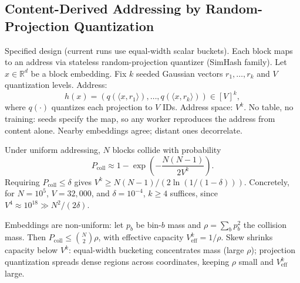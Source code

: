 \subsection{Content-Derived Addressing by Random-Projection Quantization}
\label{sec:hash}

Specified design (current runs use equal-width scalar buckets).
Each block maps to an address via stateless random-projection quantizer (SimHash family).
Let $x \in \mathbb{R}^d$ be a block embedding.
Fix $k$ seeded Gaussian vectors $r_1,\dots,r_k$ and $V$ quantization levels.
Address:
\[
h(x) = (q(\langle x, r_1 \rangle), \dots, q(\langle x, r_k \rangle)) \in [V]^k,
\]
where $q(\cdot)$ quantizes each projection to $V$ IDs.
Address space: $V^k$.
No table, no training: seeds specify the map, so any worker reproduces the address from content alone.
Nearby embeddings agree; distant ones decorrelate.

Under uniform addressing, $N$ blocks collide with probability
\[
P_{\mathrm{coll}} \approx 1 - \exp\!\left(-\frac{N(N-1)}{2V^k}\right).
\]
Requiring $P_{\mathrm{coll}} \le \delta$ gives $V^k \ge N(N-1)/(2\ln(1/(1-\delta)))$.
Concretely, for $N=10^5$, $V=32{,}000$, and $\delta=10^{-4}$, $k \ge 4$ suffices, since $V^4 \approx 10^{18} \gg N^2/(2\delta)$.

Embeddings are non-uniform: let $p_b$ be bin-$b$ mass and $\rho = \sum_b p_b^2$ the collision mass.
Then $P_{\mathrm{coll}} \le \binom{N}{2}\rho$, with effective capacity $V_{\mathrm{eff}}^k = 1/\rho$.
Skew shrinks capacity below $V^k$: equal-width bucketing concentrates mass (large $\rho$); projection quantization spreads dense regions across coordinates, keeping $\rho$ small and $V_{\mathrm{eff}}^k$ large.
